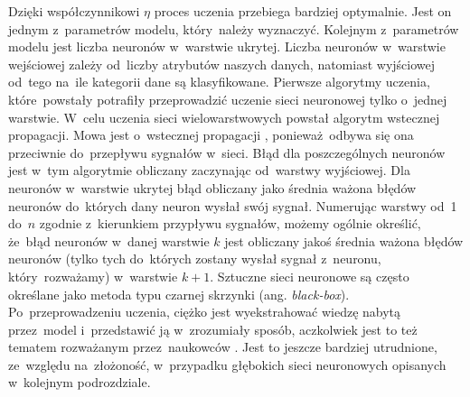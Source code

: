 Dzięki współczynnikowi $\eta$ proces uczenia przebiega bardziej optymalnie. Jest on jednym z~parametrów modelu, który~należy wyznaczyć. Kolejnym z~parametrów modelu jest liczba neuronów w~warstwie ukrytej. Liczba neuronów w~warstwie wejściowej zależy od~liczby atrybutów naszych danych, natomiast wyjściowej od~tego na~ile kategorii dane są klasyfikowane. Pierwsze algorytmy uczenia, które~powstały potrafiły przeprowadzić uczenie sieci neuronowej tylko o~jednej warstwie. W~celu uczenia sieci wielowarstwowych powstał algorytm wstecznej propagacji. Mowa jest o~wstecznej propagacji , ponieważ~odbywa się ona przeciwnie do~przepływu sygnałów w~sieci. Błąd dla poszczególnych neuronów jest w~tym algorytmie obliczany zaczynając od~warstwy wyjściowej. Dla neuronów w~warstwie ukrytej błąd obliczany jako średnia ważona błędów neuronów do~których dany neuron wysłał swój sygnał. Numerując warstwy od~1 do~$n$ zgodnie z~kierunkiem przypływu sygnałów, możemy ogólnie określić, że~błąd neuronów w~danej warstwie $k$ jest obliczany jakoś średnia ważona błędów neuronów (tylko tych do~których zostany wysłał sygnał z~neuronu, który~rozważamy) w~warstwie $k+1$. Sztuczne sieci neuronowe są często określane jako metoda typu czarnej skrzynki (ang. \textit{black-box}). Po~przeprowadzeniu uczenia, ciężko jest wyekstrahować wiedzę nabytą przez~model i~przedstawić ją w~zrozumiały sposób, aczkolwiek jest to też tematem rozważanym przez~naukowców \cite{blacboxann}. Jest to jeszcze bardziej utrudnione, ze~względu na~złożoność, w~przypadku głębokich sieci neuronowych opisanych w~kolejnym podrozdziale.

